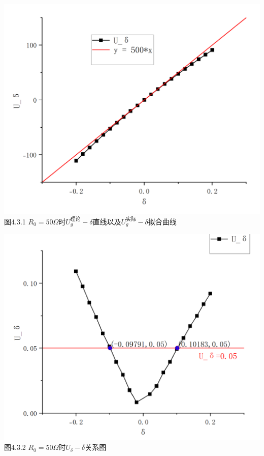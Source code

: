 \documentclass{ctexart}
\begin{document}
    ~\\
    \begin{minipage}[c]{0.5\textwidth}
        \centering \includegraphics[scale=0.4]{3.1.1} \\\small{图4.3.1 $R_0=50\Omega$时$U_g^{\text{理论}} - \delta$直线以及$U_g^{\text{实际}} - \delta$拟合曲线}
    \end{minipage}
    \begin{minipage}[c]{0.5\textwidth}
        \centering \includegraphics[scale=0.4]{3.1.2} \\\small{图4.3.2 $R_0=50\Omega$时$U_\delta -\delta $关系图}
    \end{minipage}
    ~\\
\end{document}
